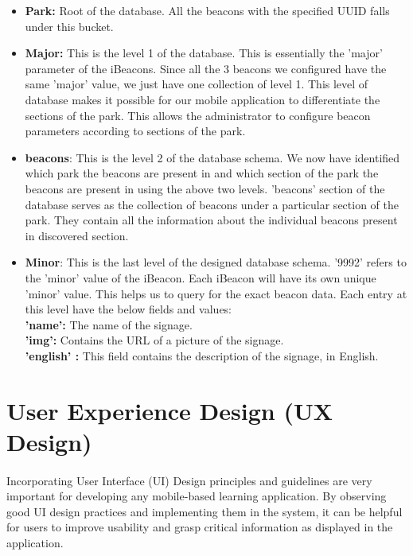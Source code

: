 \documentclass[12pt]{article}
\begin{document}
\begin{itemize}
  \item \textbf{Park:} Root of the database. All the beacons with the specified UUID falls under this bucket. 
  
  \item \textbf{Major:} This is the level 1 of the database. This is essentially the 'major' parameter of the iBeacons. Since all the 3 beacons we configured have the same 'major' value, we just have one collection of level 1. This level of database makes it possible for our mobile application to differentiate the sections of the park. This allows the administrator to configure beacon parameters according to sections of the park.
  
  \item \textbf{beacons}: This is the level 2 of the database schema. We now have identified which park the beacons are present in and which section of the park the beacons are present in using the above two levels. 'beacons' section of the database serves as the collection of beacons under a particular section of the park. They contain all the information about the individual beacons present in discovered section.
  
    \item \textbf{Minor}: This is the last level of the designed database schema. '9992' refers to the 'minor' value of the iBeacon. Each iBeacon will have its own unique 'minor' value. This helps us to query for the exact beacon data. Each entry at this level have the below fields and values: \\
    
    \textbf{'name':} The name of the signage. \\
    \textbf{'img':} Contains the URL of a picture of the signage. \\
    \textbf{'english' :} This field contains the description of the signage, in English.\\
  
\end{itemize}



\section{User Experience Design (UX Design)}
\label{ux}
\paragraph{} Incorporating User Interface (UI) Design principles and guidelines are very important for developing any mobile-based learning application. By observing good UI design practices and implementing them in the system, it can be helpful for users to improve usability and grasp critical information as displayed in the application. 
\end{document}
